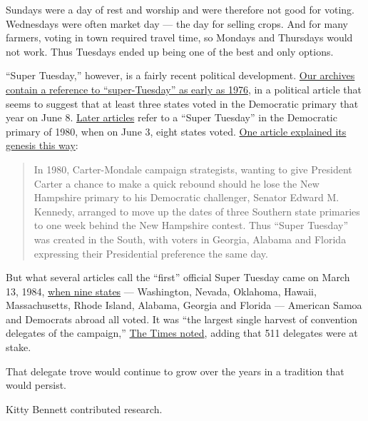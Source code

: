 Sundays were a day of rest and worship and were therefore not good for
voting. Wednesdays were often market day --- the day for selling crops.
And for many farmers, voting in town required travel time, so Mondays
and Thursdays would not work. Thus Tuesdays ended up being one of the
best and only options.

``Super Tuesday,'' however, is a fairly recent political development.
\href{https://timesmachine.nytimes3xbfgragh.onion/timesmachine/1976/05/09/76390315.html?pageNumber=136}{Our
archives contain a reference to ``super-Tuesday'' as early as 1976}, in
a political article that seems to suggest that at least three states
voted in the Democratic primary that year on June 8.
\href{https://www.nytimes3xbfgragh.onion/1982/05/02/magazine/the-party-that-lost-its-way.html}{Later
articles} refer to a ``Super Tuesday'' in the Democratic primary of
1980, when on June 3, eight states voted.
\href{https://www.nytimes3xbfgragh.onion/1983/06/17/us/briefing-will-tuesday-be-super.html}{One
article explained its genesis this way}:

\begin{quote}
In 1980, Carter-Mondale campaign strategists, wanting to give President
Carter a chance to make a quick rebound should he lose the New Hampshire
primary to his Democratic challenger, Senator Edward M. Kennedy,
arranged to move up the dates of three Southern state primaries to one
week behind the New Hampshire contest. Thus ``Super Tuesday'' was
created in the South, with voters in Georgia, Alabama and Florida
expressing their Presidential preference the same day.
\end{quote}

But what several articles call the ``first'' official Super Tuesday came
on March 13, 1984,
\href{https://timesmachine.nytimes3xbfgragh.onion/timesmachine/1984/03/14/052064.html?pageNumber=37}{when
nine states} --- Washington, Nevada, Oklahoma, Hawaii, Massachusetts,
Rhode Island, Alabama, Georgia and Florida --- American Samoa and
Democrats abroad all voted. It was ``the largest single harvest of
convention delegates of the campaign,''
\href{https://www.nytimes3xbfgragh.onion/1984/03/14/us/hart-takes-massachusetts-florida-and-rhode-island-mondale-is-strong-in-south.html}{The
Times noted}, adding that 511 delegates were at stake.

That delegate trove would continue to grow over the years in a tradition
that would persist.

Kitty Bennett contributed research.

